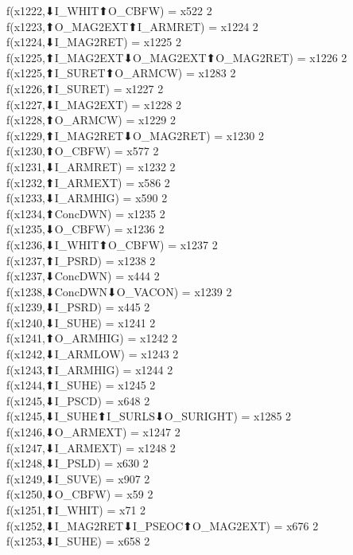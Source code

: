 f(x1222,⬇I_WHIT⬆O_CBFW) = x522 {2} \\
f(x1223,⬆O_MAG2EXT⬆I_ARMRET) = x1224 {2} \\
f(x1224,⬇I_MAG2RET) = x1225 {2} \\
f(x1225,⬆I_MAG2EXT⬇O_MAG2EXT⬆O_MAG2RET) = x1226 {2} \\
f(x1225,⬆I_SURET⬆O_ARMCW) = x1283 {2} \\
f(x1226,⬆I_SURET) = x1227 {2} \\
f(x1227,⬇I_MAG2EXT) = x1228 {2} \\
f(x1228,⬆O_ARMCW) = x1229 {2} \\
f(x1229,⬆I_MAG2RET⬇O_MAG2RET) = x1230 {2} \\
f(x1230,⬆O_CBFW) = x577 {2} \\
f(x1231,⬇I_ARMRET) = x1232 {2} \\
f(x1232,⬆I_ARMEXT) = x586 {2} \\
f(x1233,⬇I_ARMHIG) = x590 {2} \\
f(x1234,⬆ConcDWN) = x1235 {2} \\
f(x1235,⬇O_CBFW) = x1236 {2} \\
f(x1236,⬇I_WHIT⬆O_CBFW) = x1237 {2} \\
f(x1237,⬆I_PSRD) = x1238 {2} \\
f(x1237,⬇ConcDWN) = x444 {2} \\
f(x1238,⬇ConcDWN⬇O_VACON) = x1239 {2} \\
f(x1239,⬇I_PSRD) = x445 {2} \\
f(x1240,⬇I_SUHE) = x1241 {2} \\
f(x1241,⬆O_ARMHIG) = x1242 {2} \\
f(x1242,⬇I_ARMLOW) = x1243 {2} \\
f(x1243,⬆I_ARMHIG) = x1244 {2} \\
f(x1244,⬆I_SUHE) = x1245 {2} \\
f(x1245,⬇I_PSCD) = x648 {2} \\
f(x1245,⬇I_SUHE⬆I_SURLS⬇O_SURIGHT) = x1285 {2} \\
f(x1246,⬇O_ARMEXT) = x1247 {2} \\
f(x1247,⬇I_ARMEXT) = x1248 {2} \\
f(x1248,⬇I_PSLD) = x630 {2} \\
f(x1249,⬇I_SUVE) = x907 {2} \\
f(x1250,⬇O_CBFW) = x59 {2} \\
f(x1251,⬆I_WHIT) = x71 {2} \\
f(x1252,⬇I_MAG2RET⬇I_PSEOC⬆O_MAG2EXT) = x676 {2} \\
f(x1253,⬇I_SUHE) = x658 {2} \\
